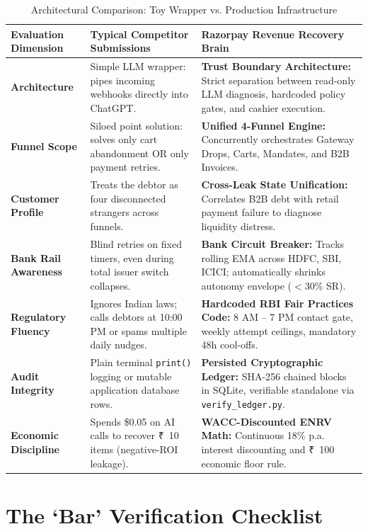 \documentclass[11pt, a4paper]{article}
\newcommand{\INR}{{\rupeefont ₹}}
\begin{document}
\begin{table}[h!]
\centering
\small
\renewcommand{\arraystretch}{1.35}
\begin{tabularx}{\textwidth}{l p{5.0cm} X}
\toprule
\textbf{Evaluation Dimension} & \textbf{Typical Competitor Submissions} & \textbf{Razorpay Revenue Recovery Brain} \\
\midrule
\textbf{Architecture} & Simple LLM wrapper: pipes incoming webhooks directly into ChatGPT. & \textbf{Trust Boundary Architecture:} Strict separation between read-only LLM diagnosis, hardcoded policy gates, and cashier execution. \\
\textbf{Funnel Scope} & Siloed point solution: solves only cart abandonment OR only payment retries. & \textbf{Unified 4-Funnel Engine:} Concurrently orchestrates Gateway Drops, Carts, Mandates, and B2B Invoices. \\
\textbf{Customer Profile} & Treats the debtor as four disconnected strangers across funnels. & \textbf{Cross-Leak State Unification:} Correlates B2B debt with retail payment failure to diagnose liquidity distress. \\
\textbf{Bank Rail Awareness} & Blind retries on fixed timers, even during total issuer switch collapses. & \textbf{Bank Circuit Breaker:} Tracks rolling EMA across HDFC, SBI, ICICI; automatically shrinks autonomy envelope ($<$30\% SR). \\
\textbf{Regulatory Fluency} & Ignores Indian laws; calls debtors at 10:00 PM or spams multiple daily nudges. & \textbf{Hardcoded RBI Fair Practices Code:} 8 AM -- 7 PM contact gate, weekly attempt ceilings, mandatory 48h cool-offs. \\
\textbf{Audit Integrity} & Plain terminal \texttt{print()} logging or mutable application database rows. & \textbf{Persisted Cryptographic Ledger:} SHA-256 chained blocks in SQLite, verifiable standalone via \texttt{verify\_ledger.py}. \\
\textbf{Economic Discipline} & Spends \$0.05 on AI calls to recover \INR~10 items (negative-ROI leakage). & \textbf{WACC-Discounted ENRV Math:} Continuous 18\% p.a. interest discounting and \INR~100 economic floor rule. \\
\bottomrule
\end{tabularx}
\caption{Architectural Comparison: Toy Wrapper vs. Production Infrastructure}
\end{table}

\section{The `Bar' Verification Checklist}
\end{document}
